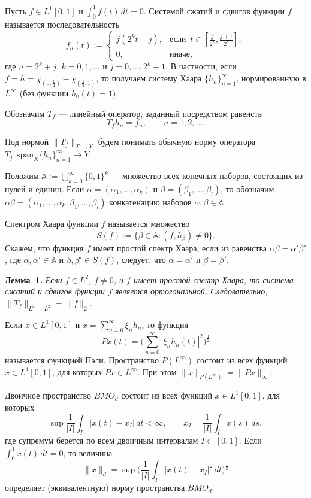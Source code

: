 


\vzmscaption

Пусть $f\in L^1[0,1]$ и $\int_0^1f(t)\,dt=0$. Системой сжатий и сдвигов функции $f$ называется последовательность
$$
f_n(t):=\begin{cases}
f(2^kt-j), & \text{если}\,\,\, t\in[\frac{j}{2^k},\frac{j+1}{2^k}], \\
0, & \text{иначе},
\end{cases}
$$
где $n=2^k+j$, $k=0,1,\ldots$ и $j=0,\ldots,2^k-1$. В частности, если $f=h=\chi_{(0,\frac12)}-\chi_{(\frac12,1)}$, то получаем
систему Хаара $\{h_n\}_{n=1}^{\infty}$, нормированную в $L^{\infty}$ (без функции $h_0(t)=1$).

Обозначим $T_f$ --- линейный оператор, заданный посредством равенств
$$
T_fh_n=f_n, \qquad n=1,2,\ldots.
$$

Под нормой $\|T_f\|_{X\to Y}$ будем понимать обычную норму оператора $T_f:\overline{\text{span}}_X\{h_n\}_{n=1}^{\infty}\to Y$.

Положим $\mathbb{A}:=\bigcup_{k=0}^{\infty}\{0,1\}^k$ --- множество всех конечных наборов, состоящих из нулей и единиц.
Если $\alpha=(\alpha_1,\ldots,\alpha_k)$ и $\beta=(\beta_1,\ldots,\beta_l)$, то обозначим
$\alpha\beta=(\alpha_1,\ldots,\alpha_k,\beta_1,\ldots,\beta_l)$ конкатенацию наборов $\alpha,\beta\in\mathbb{A}$.

Спектром Хаара функции $f$ называется множество
$$
S(f):=\{\beta\in\mathbb{A}:(f,h_{\beta})\neq0\}.
$$
Скажем, что функция $f$ имеет простой спектр Хаара, если из равенства $\alpha\beta=\alpha'\beta'$, где $\alpha,\alpha'\in\mathbb{A}$ и $\beta,\beta'\in S(f)$, следует, что $\alpha=\alpha'$ и $\beta=\beta'$.

\textbf{Лемма~1.} {\it Если $f\in L^2$, $f\neq0$, и $f$ имеет простой спектр Хаара, то система сжатий и сдвигов функции $f$ является ортогональной.
Следовательно, $\|T_f\|_{L^2\to L^2}=\|f\|_2$.}

Если $x\in L^1[0,1]$ и $x=\sum_{n=0}^{\infty}\xi_nh_n$, то функция
$$
Px(t)=\biggl(\sum_{n=0}^{\infty}|\xi_nh_n(t)|^2\biggr)^{\frac12}
$$
называется функцией Пэли. Пространство $P(L^{\infty})$ состоит из всех функций $x\in L^1[0,1]$, для которых $Px\in L^{\infty}$.
При этом $\|x\|_{P(L^{\infty})}=\|Px\|_{\infty}$.

Двоичное пространство $BMO_d$ состоит из всех функций $x\in L^1[0,1]$, для которых
$$
\sup\frac{1}{|I|}\int_I|x(t)-x_I|\,dt<\infty, \qquad x_I=\frac{1}{|I|}\int_Ix(s)\,ds,
$$
где супремум берётся по всем двоичным интервалам $I\subset[0,1]$. Если $\int_0^1x(t)\,dt=0$, то величина
$$
\|x\|_d=\sup\biggl(\frac{1}{|I|}\int_I|x(t)-x_I|^2\,dt\biggr)^{\frac12}
$$
определяет (эквивалентную) норму пространства $BMO_d$.

